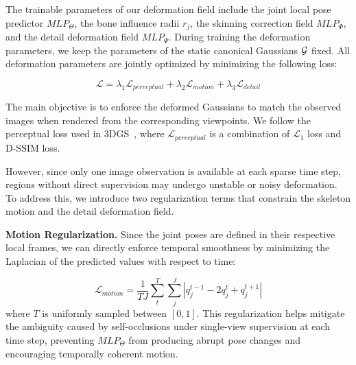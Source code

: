 The trainable parameters of our deformation field include the joint local pose predictor $MLP_\Theta$, the bone influence radii $r_j$, the skinning correction field $MLP_\Phi$, and the detail deformation field $MLP_\Psi$. During training the deformation parameters, we keep the parameters of the static canonical Gaussians $\mathcal{G}$ fixed. All deformation parameters are jointly optimized by minimizing the following loss:

\begin{equation} \label{dyn_eq:loss_func}
\mathcal{L} = \lambda_{1}\mathcal{L}_{perceptual} + \lambda_{2}\mathcal{L}_{motion} + \lambda_{3}\mathcal{L}_{detail}
\end{equation}



The main objective is to enforce the deformed Gaussians to match the observed images when rendered from the corresponding viewpoints. We follow the perceptual loss used in 3DGS~\cite{kerbl3Dgaussians}, where $\mathcal{L}_{perceptual}$ is a combination of $\mathcal{L}_{1}$ loss and D-SSIM loss. 

However, since only one image observation is available at each sparse time step, regions without direct supervision may undergo unstable or noisy deformation. To address this, we introduce two regularization terms that constrain the skeleton motion and the detail deformation field.

\par 
\vspace{6pt}
\noindent\textbf{Motion Regularization.} 
Since the joint poses are defined in their respective local frames, we can directly enforce temporal smoothness by minimizing the Laplacian of the predicted values with respect to time:

\begin{equation}
\mathcal{L}_{motion} = \frac{1}{T J}\sum_t^T \sum_j^J \left| q_j^{t-1} - 2q_j^t + q_j^{t+1} \right |
\end{equation}
where $T$ is uniformly sampled between $[0,1]$. 
This regularization helps mitigate the ambiguity caused by self-occlusions under single-view supervision at each time step, preventing $MLP_\Theta$ from producing abrupt pose changes and encouraging temporally coherent motion.

